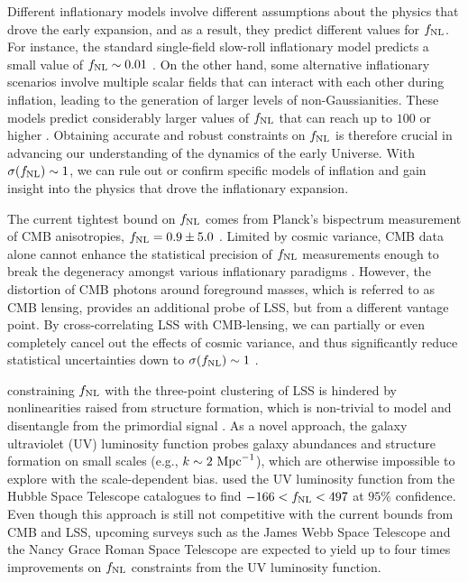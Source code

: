 Different inflationary models involve different assumptions about the physics that drove the early expansion, and as a result, they predict different values for $f_{\rm NL}$. For instance, the standard single-field slow-roll inflationary model predicts a small value of $f_{\rm NL} \sim 0.01$ \citep[see, also,][for a discussion]{2003JHEP...05..013M}. On the other hand, some alternative inflationary scenarios involve multiple scalar fields that can interact with each other during inflation, leading to the generation of larger levels of non-Gaussianities. These models predict considerably larger values of $f_{\rm NL}$ that can reach up to $100$ or higher \citep[see, e.g.,][]{alvarez2014arXiv1412.4671A, de2017next}. Obtaining accurate and robust constraints on $f_{\rm NL}$ is therefore crucial in advancing our understanding of the dynamics of the early Universe. With $\sigma (f_{\rm NL})\sim 1$, we can rule out or confirm specific models of inflation and gain insight into the physics that drove the inflationary expansion.

The current tightest bound on $f_{\rm NL}$ comes from Planck's bispectrum measurement of CMB anisotropies, $f_{\rm NL}=0.9\pm 5.0$ \citep{akrami2019planck}. Limited by cosmic variance, CMB data alone cannot enhance the statistical precision of $f_{\rm NL}$ measurements enough to break the degeneracy amongst various inflationary paradigms \citep[see, e.g.,][]{ade2019simons}. However, the distortion of CMB photons around foreground masses, which is referred to as CMB lensing, provides an additional probe of LSS, but from a different vantage point. By cross-correlating LSS with CMB-lensing, we can partially or even completely cancel out the effects of cosmic variance, and thus significantly reduce statistical uncertainties down to $\sigma(f_{\rm NL})\sim 1$ \citep[see, e.g.,][]{schmittfull2018PhRvD}.


 constraining $f_{\rm NL}$ with the three-point clustering of LSS is hindered by nonlinearities raised from structure formation, which is non-trivial to model and disentangle from the primordial signal \citep{baldauf2011galaxy, baldauf2011primordial}. As a novel approach, the galaxy ultraviolet (UV) luminosity function probes galaxy abundances and structure formation on small scales (e.g., $k \sim 2~{\rm Mpc}^{-1}$), which are otherwise impossible to explore with the scale-dependent bias. \cite{sabti2021JCAP} used the UV luminosity function from the Hubble Space Telescope catalogues \citep{bouwens2015ApJ} to find $-166<f_{\rm NL}<497$ at $95\%$ confidence. Even though this approach is still not competitive with the current bounds from CMB and LSS, upcoming surveys such as the James Webb Space Telescope and the Nancy Grace Roman Space Telescope are expected to yield up to four times improvements on $
f_{\rm NL}$ constraints from the UV luminosity function. 


